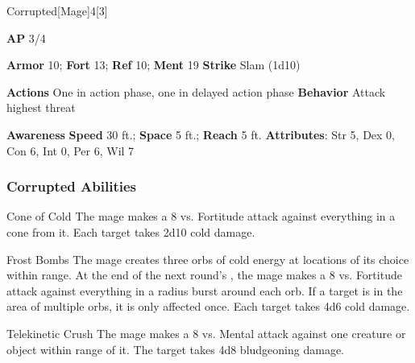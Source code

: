 \begin{monsection}{Corrupted}[Mage]{4}[3]
\vspace{-1em}\vspace{-1em}
\begin{spellcontent}
\begin{spelltargetinginfo}
{\textbf{AP} 3/4}

\pari \textbf{Armor} 10;
\textbf{Fort} 13;
\textbf{Ref} 10;
\textbf{Ment} 19
\pari \textbf{Strike} Slam  (1d10)


\pari \textbf{Actions} One in action phase, one in delayed action phase
\pari \textbf{Behavior} Attack highest threat
\end{spelltargetinginfo}
\end{spellcontent}

\begin{monsterfooter}
\pari \textbf{Awareness} 
\pari \textbf{Speed} 30 ft.;
\textbf{Space} 5 ft.;
\textbf{Reach} 5 ft.
\pari \textbf{Attributes}:
Str 5,
Dex 0,
Con 6,
Int 0,
Per 6,
Wil 7
\end{monsterfooter}
\end{monsection}


\subsubsection{Corrupted Abilities}

\begin{freeability}{Cone of Cold}
The mage makes a 8 vs. Fortitude attack against everything in a \areamed cone from it.
\hit Each target takes 2d10 cold damage.
\end{freeability}

\vspace{0.5em}
\begin{freeability}{Frost Bombs}
The mage creates three orbs of cold energy at locations of its choice within \rngmed range.
At the end of the next round's ,
the mage makes a 8 vs. Fortitude attack against everything in a \areasmall radius burst around each orb.
If a target is in the area of multiple orbs, it is only affected once.
\hit Each target takes 4d6 cold damage.
\end{freeability}

\vspace{0.5em}
\begin{freeability}{Telekinetic Crush}
The mage makes a 8 vs. Mental attack against one creature or object within \rngmed range of it.
\hit The target takes 4d8 bludgeoning damage.
\end{freeability}
